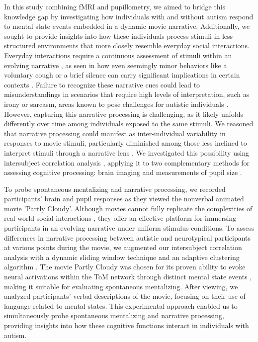 In this study combining fMRI and pupillometry, we aimed to bridge this knowledge gap by investigating how individuals with and without autism respond to mental state events embedded in a dynamic movie narrative. Additionally, we sought to provide insights into how these individuals process stimuli in less structured environments that more closely resemble everyday social interactions. Everyday interactions require a continuous assessment of stimuli within an evolving narrative \citep{goffman1974,johnson2023,stolk2022}, as seen in how even seemingly minor behaviors like a voluntary cough or a brief silence can carry significant implications in certain contexts \citep{kendon1994}. Failure to recognize these narrative cues could lead to misunderstandings in scenarios that require high levels of interpretation, such as irony or sarcasm, areas known to pose challenges for autistic individuals \citep{deliens2018,zalla2014}. However, capturing this narrative processing is challenging, as it likely unfolds differently over time among individuals exposed to the same stimuli. We reasoned that narrative processing could manifest as inter-individual variability in responses to movie stimuli, particularly diminished among those less inclined to interpret stimuli through a narrative lens \citep{chang2021,finn2018,owen2023,zhang2022}. We investigated this possibility using intersubject correlation analysis \citep{hasson2004}, applying it to two complementary methods for assessing cognitive processing: brain imaging and measurements of pupil size \citep{beatty1982}.

To probe spontaneous mentalizing and narrative processing, we recorded participants' brain and pupil responses as they viewed the nonverbal animated movie 'Partly Cloudy'\citep{jacoby2016,paunov2019}. Although movies cannot fully replicate the complexities of real-world social interactions \citep{wheatley2019}, they offer an effective platform for immersing participants in an evolving narrative under uniform stimulus conditions. To assess differences in narrative processing between autistic and neurotypical participants at various points during the movie, we augmented our intersubject correlation analysis with a dynamic sliding window technique and an adaptive clustering algorithm \citep{maris2007}. The movie Partly Cloudy was chosen for its proven ability to evoke neural activations within the ToM network through distinct mental state events \citep{jacoby2016,richardson2018}, making it suitable for evaluating spontaneous mentalizing. After viewing, we analyzed participants' verbal descriptions of the movie, focusing on their use of language related to mental states. This experimental approach enabled us to simultaneously probe spontaneous mentalizing and narrative processing, providing insights into how these cognitive functions interact in individuals with autism.


